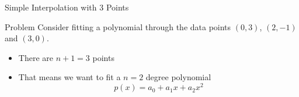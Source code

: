 \documentclass[10pt]{beamer}
\begin{document}
\begin{frame}{Simple Interpolation with 3 Points}

\begin{block}{Problem}
    Consider fitting a polynomial through the data points $(0,3)$, $(2,-1)$ and $(3,0)$.
\end{block}

\begin{figure}
    \centering
\end{figure}
\begin{itemize}
    \item There are $n+1=3$ points 
    \item That means we want to fit a $n=2$ degree polynomial
    $$
    p(x) = a_0 + a_1x + a_2x^2
    $$
\end{itemize}
    
\end{frame}
\end{document}
